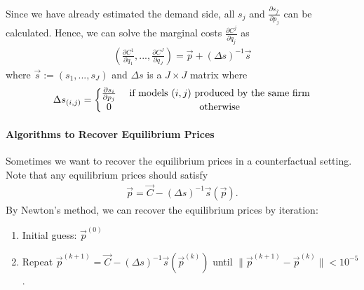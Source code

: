 \documentclass[11pt]{elegantbook}
\begin{document}
Since we have already estimated the demand side, all $s_j$ and $\frac{\partial s_{j'}}{\partial p_j}$ can be calculated. Hence, we can solve the marginal costs $\frac{\partial C^{j}}{\partial q_{j}}$ as
\begin{equation}
    \begin{aligned}
        \left(\frac{\partial C^{1}}{\partial q_{1}},...,\frac{\partial C^{J}}{\partial q_{J}}\right)=\vec{p}+(\Delta s)^{-1}\vec{s}
    \end{aligned}
    \nonumber
\end{equation}
where $\vec{s}:=\left(s_1,...,s_J\right)$ and $\Delta s$ is a $J\times J$ matrix where
\begin{equation}
    \begin{aligned}
        {\Delta s}_{(i,j)}=
        \left\{\begin{matrix}
            \frac{\partial s_i}{\partial p_j}& \textnormal{ if models $(i,j)$ produced by the same firm}\\
            0& \textnormal{ otherwise}
        \end{matrix}\right.
    \end{aligned}
    \nonumber
\end{equation}

\paragraph*{Algorithms to Recover Equilibrium Prices}
Sometimes we want to recover the equilibrium prices in a counterfactual setting. Note that any equilibrium prices should satisfy
\begin{equation}
    \begin{aligned}
        \vec{p}=\vec{C}-(\Delta s)^{-1}\vec{s}(\vec{p}).
    \end{aligned}
    \nonumber
\end{equation}
By Newton's method, we can recover the equilibrium prices by iteration:
\begin{enumerate}
    \item Initial guess: $\vec{p}^{(0)}$
    \item Repeat $\vec{p}^{(k+1)}=\vec{C}-(\Delta s)^{-1}\vec{s}(\vec{p}^{(k)})$ until $\|\vec{p}^{(k+1)}-\vec{p}^{(k)}\|<10^{-5}$.
\end{enumerate}
\end{document}
